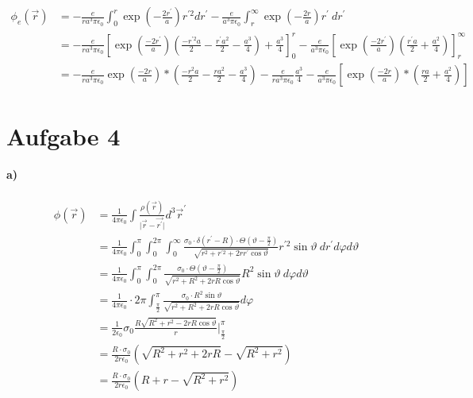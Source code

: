 \documentclass{article}
\newcommand{\epsz}{\epsilon_0}
\begin{document}
\begin{align*}
	\phi_e\left( \vec r \right)
	&= - \frac{e}{r a^3 \pi\epsz}
	\int_0^r
	\exp\left(-\frac{2r^\prime}{a} \right)
	r^{\prime 2}
	dr^\prime
	- \frac e {a^3 \pi\epsz}
	\int_r^\infty
	\exp\left(-\frac{2r}{a} \right)
	r^\prime \
	dr^\prime
	\\
	&= - \frac{e}{r a^3 \pi\epsz}
	\left[
		\exp\left(\frac{-2r^\prime}{a}\right)
		\left( \frac{-r^{\prime 2}a}{2} - \frac{r^\prime a^2}{2} - 
		\frac{a^3}{4}
		\right)
		+\frac{a^3}{4}
	\right]_0^r 
	- \frac e {a^3 \pi\epsz}
	\left[
		\exp\left(\frac{-2r^\prime}{a}\right)
		\left( \frac{r^\prime a}{2} + \frac{a^2}{4} \right)
	\right]_r^\infty
	\\
	&= - \frac{e}{r a^3 \pi\epsz}
		\exp\left( \frac{-2r}{a} \right) *
		\left(
		\frac{-r^2a}{2} - \frac{ra^2}{2} - \frac{a^3}{4}
		\right)
	- \frac{e}{r a^3 \pi\epsz}
		\frac{a^3}{4}
	- \frac{e}{a^3 \pi \epsz}
	\left[
		\exp\left( \frac{-2r}{a} \right) * 
		\left(
		\frac{ra}{2} + \frac{a^2}{4}
		\right)
	\right]
\end{align*}


\section*{Aufgabe 4}
\paragraph{a)}
\begin{align*}
	\phi(\vec r) 
	&= \frac{1}{4\pi\epsz} \int \frac{\rho(\vec r)}{\vert \vec r - \vec{
		r^\prime} \vert} d^3 \vec r^\prime \\
	&= \frac{1}{4\pi\epsz} 
		\int_0^\pi \int_0^{2\pi} \int_0^\infty
		\frac{
		\sigma_0 \cdot \delta(r^\prime - R) \cdot \Theta
		\left( \vartheta - \frac \pi 2 \right)}
		{\sqrt{ r^2 + r^{\prime 2} + 2 r r^\prime \cos\vartheta }}
		r^{\prime 2} \sin\vartheta \
		dr^\prime d\varphi d\vartheta \\
	&= \frac{1}{4\pi\epsz} 
		\int_0^\pi \int_0^{2\pi}
		\frac{
		\sigma_0 \cdot \Theta 
		\left( \vartheta - \frac \pi 2 \right)}
		{\sqrt{ r^2  + R^2 + 2 r R \cos\vartheta }}
		R^2 \sin\vartheta \
		d\varphi d\vartheta \\
	&= \frac{1}{4\pi\epsz} \cdot 2\pi
		\int_{\frac \pi 2}^{\pi}
		\frac{\sigma_0 \cdot R^2 \sin\vartheta}
		{\sqrt{ r^2  + R^2 + 2 r R \cos\vartheta }}
		d\varphi \\
	&= \frac{1}{2\epsz} \sigma_0 \frac{R 
	\sqrt{R^2 + r^2 - 2rR\cos\vartheta}}{r} 
	|_{\frac \pi 2}^\pi \\
	&= \frac{R \cdot \sigma_0}{2 r \epsz} \left(
		\sqrt{R^2 + r^2 + 2rR} - \sqrt{R^2 + r^2}
	\right) \\
	&= \frac{R \cdot \sigma_0}{2 r \epsz} \left(
		R + r - \sqrt{R^2 + r^2}
	\right) \\
\end{align*}
\end{document}
